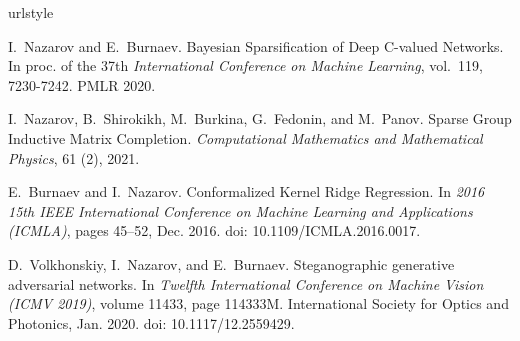 \documentclass{resume} %
\begin{document}
\bigskip
{
\scriptsize

\renewcommand{\clearpage}{}

\renewcommand{\refname}{Published or Accepted Papers}
\makeatletter
\renewcommand{\bibsection}{%
   \section*{\refname%
            \@mkboth{\MakeUppercase{\refname}}{\MakeUppercase{\refname}}%
   }
}
\makeatother

\begin{thebibliography}{10}
\providecommand{\natexlab}[1]{#1}
\providecommand{\url}[1]{\texttt{#1}}
\expandafter\ifx\csname urlstyle\endcsname\relax
  \providecommand{\doi}[1]{doi: #1}\else
  \providecommand{\doi}{doi: \begingroup \urlstyle{rm}\Url}\fi

I.~Nazarov and E.~Burnaev.
\newblock Bayesian {Sparsification} of {Deep} {C}-valued {Networks}.
\newblock In proc. of the 37th \emph{International {Conference} on {Machine} {Learning}},
  vol.~119, 7230-7242. PMLR 2020.

I.~Nazarov, B.~Shirokikh, M.~Burkina, G.~Fedonin, and M.~Panov.
\newblock Sparse {Group} {Inductive} {Matrix} {Completion}.
\newblock \emph{Computational Mathematics and Mathematical Physics},
  61 (2), 2021.

E.~Burnaev and I.~Nazarov.
\newblock Conformalized {Kernel} {Ridge} {Regression}.
\newblock In \emph{2016 15th {IEEE} {International} {Conference} on {Machine}
  {Learning} and {Applications} ({ICMLA})}, pages 45--52, Dec. 2016.
\newblock \doi{10.1109/ICMLA.2016.0017}.

D.~Volkhonskiy, I.~Nazarov, and E.~Burnaev.
\newblock Steganographic generative adversarial networks.
\newblock In \emph{Twelfth {International} {Conference} on {Machine} {Vision}
  ({ICMV} 2019)}, volume 11433, page 114333M. International Society for Optics
  and Photonics, Jan. 2020.
\newblock \doi{10.1117/12.2559429}.


\end{thebibliography}}
\end{document}
